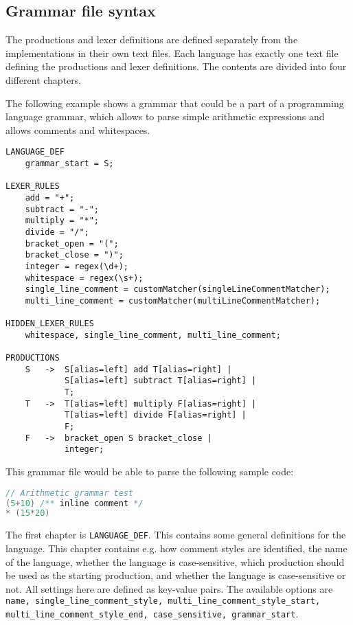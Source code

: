 \subsection{Grammar file syntax}
The productions and lexer definitions are defined separately from the implementations in their own text files. 
Each language has exactly one text file defining the productions and lexer definitions. The contents are divided into four different chapters.

The following example shows a grammar that could be a part of a programming language grammar, which allows to parse simple arithmetic expressions and allows comments and whitespaces.

\begin{lstlisting}[caption=Grammar file example]
LANGUAGE_DEF
    grammar_start = S;

LEXER_RULES
    add = "+";
    subtract = "-";
    multiply = "*";
    divide = "/";
    bracket_open = "(";
    bracket_close = ")";
    integer = regex(\d+);
    whitespace = regex(\s+);
    single_line_comment = customMatcher(singleLineCommentMatcher);
    multi_line_comment = customMatcher(multiLineCommentMatcher);

HIDDEN_LEXER_RULES
    whitespace, single_line_comment, multi_line_comment;

PRODUCTIONS
    S   ->  S[alias=left] add T[alias=right] | 
            S[alias=left] subtract T[alias=right] | 
            T;
    T   ->  T[alias=left] multiply F[alias=right] | 
            T[alias=left] divide F[alias=right] | 
            F;
    F   ->  bracket_open S bracket_close | 
            integer;
\end{lstlisting}

This grammar file would be able to parse the following sample code:

\begin{lstlisting}[language=Java, caption=Grammar file example]
// Arithmetic grammar test
(5+10) /** inline comment */ 
* (15*20)
\end{lstlisting}

The first chapter is \verb|LANGUAGE_DEF|. This contains some general definitions for the language. 
This chapter contains e.g. how comment styles are identified, the name of the language, whether the language is case-sensitive, which production should be used as the starting production, 
and whether the language is case-sensitive or not. 
All settings here are defined as key-value pairs.
The available options are \lstinline|name, single_line_comment_style, multi_line_comment_style_start, multi_line_comment_style_end, case_sensitive, grammar_start|.

